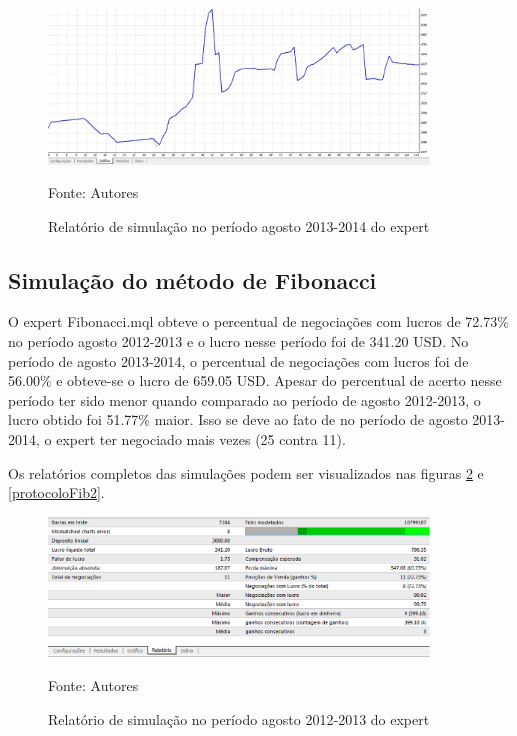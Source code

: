 \begin{figure}[htp]
\centering
\includegraphics[width=0.9\textwidth]{figuras/protocoloMinimos4}
\caption{Relatório de simulação no período agosto 2013-2014 do expert}{Fonte: Autores} 
\label{protocoloMinimos4}
\end{figure}

\subsection{Simulação do método de Fibonacci}

O expert Fibonacci.mql obteve o percentual de negociações com lucros de 72.73\% no período agosto 2012-2013 e o  lucro nesse período foi de 341.20 USD.
No período de agosto 2013-2014, o percentual de negociações com lucros foi de 56.00\%  e obteve-se o lucro de 659.05 USD. Apesar do percentual de acerto nesse período ter sido menor quando comparado ao período de agosto 2012-2013, o lucro obtido foi 51.77\% maior. Isso se deve ao fato de no período de agosto 2013-2014, o expert ter negociado mais vezes (25 contra 11).

Os relatórios completos das simulações podem ser visualizados nas figuras \ref{protocoloFib} e \ref{protocoloFib2}.

\begin{figure}[htp]
\centering
\includegraphics[width=0.9\textwidth]{figuras/protocoloFib}
\caption{Relatório de simulação no período agosto 2012-2013 do expert}{Fonte: Autores} 
\label{protocoloFib}
\end{figure}

